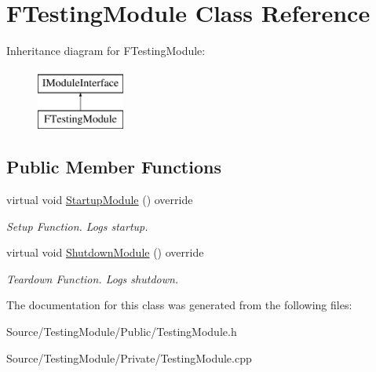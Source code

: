 \hypertarget{class_f_testing_module}{}\section{F\+Testing\+Module Class Reference}
\label{class_f_testing_module}
Inheritance diagram for F\+Testing\+Module\+:\begin{figure}[H]
\begin{center}
\leavevmode
\includegraphics[height=2.000000cm]{class_f_testing_module}
\end{center}
\end{figure}
\subsection*{Public Member Functions}
\begin{DoxyCompactItemize}
\item 
\mbox{\label{class_f_testing_module_a0d4c4e00c59e49db76da01eb960966f1}} 
virtual void \mbox{\hyperlink{class_f_testing_module_a0d4c4e00c59e49db76da01eb960966f1}{Startup\+Module}} () override
\begin{DoxyCompactList}\small\item\em Setup Function. Logs startup. \end{DoxyCompactList}\item 
\mbox{\label{class_f_testing_module_afac07308b91f8a5d54a7934b055a2030}} 
virtual void \mbox{\hyperlink{class_f_testing_module_afac07308b91f8a5d54a7934b055a2030}{Shutdown\+Module}} () override
\begin{DoxyCompactList}\small\item\em Teardown Function. Logs shutdown. \end{DoxyCompactList}\end{DoxyCompactItemize}


The documentation for this class was generated from the following files\+:\begin{DoxyCompactItemize}
\item 
Source/\+Testing\+Module/\+Public/Testing\+Module.\+h\item 
Source/\+Testing\+Module/\+Private/Testing\+Module.\+cpp\end{DoxyCompactItemize}
